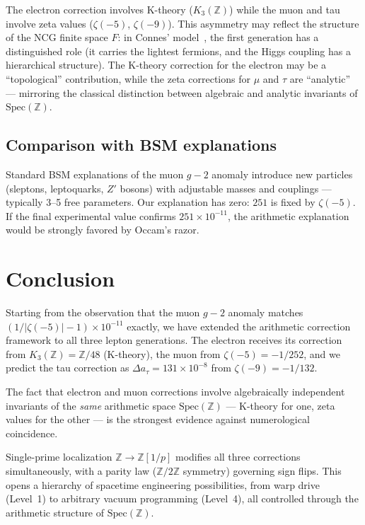 \documentclass[11pt,a4paper]{article}
\newcommand{\Spec}{\mathrm{Spec}}
\begin{document}
The electron correction involves K-theory ($K_3(\mathbb{Z})$)
while the muon and tau involve zeta values ($\zeta(-5)$, $\zeta(-9)$).
This asymmetry may reflect the structure of the NCG finite
space $F$: in Connes' model~\cite{CCM2007}, the first generation
has a distinguished role (it carries the lightest fermions, and
the Higgs coupling has a hierarchical structure). The K-theory
correction for the electron may be a ``topological'' contribution,
while the zeta corrections for $\mu$ and $\tau$ are ``analytic''
--- mirroring the classical distinction between algebraic and
analytic invariants of $\Spec(\mathbb{Z})$.

\subsection{Comparison with BSM explanations}

Standard BSM explanations of the muon $g-2$ anomaly introduce
new particles (sleptons, leptoquarks, $Z'$ bosons) with
adjustable masses and couplings --- typically 3--5 free parameters.
Our explanation has zero: $251$ is fixed by $\zeta(-5)$.
If the final experimental value confirms $251 \times 10^{-11}$,
the arithmetic explanation would be strongly favored by
Occam's razor.

\section{Conclusion}

Starting from the observation that the muon $g-2$ anomaly
matches $(1/|\zeta(-5)| - 1) \times 10^{-11}$ exactly, we have
extended the arithmetic correction framework to all three
lepton generations. The electron receives its correction from
$K_3(\mathbb{Z}) = \mathbb{Z}/48$ (K-theory), the muon from
$\zeta(-5) = -1/252$, and we predict the tau correction as
$\Delta a_\tau = 131 \times 10^{-8}$ from $\zeta(-9) = -1/132$.

The fact that electron and muon corrections involve algebraically
independent invariants of the \emph{same} arithmetic space
$\Spec(\mathbb{Z})$ --- K-theory for one, zeta values for the
other --- is the strongest evidence against numerological
coincidence.

Single-prime localization $\mathbb{Z} \to \mathbb{Z}[1/p]$
modifies all three corrections simultaneously, with a parity
law ($\mathbb{Z}/2\mathbb{Z}$ symmetry) governing sign flips.
This opens a hierarchy of spacetime engineering possibilities,
from warp drive (Level~1) to arbitrary vacuum programming
(Level~4), all controlled through the arithmetic structure
of $\Spec(\mathbb{Z})$.
\end{document}
